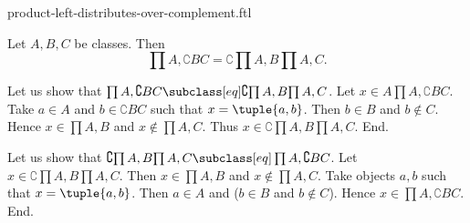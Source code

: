 \documentclass{article}
\begin{document}
\begin{smodule}[creators={Marcel Schütz}]{product-left-distributes-over-complement.ftl}

  \begin{fproposition*}[label=8696705885143040]
    Let $A, B, C$ be classes.
    Then \[\prod{A,\complement{B}{C}} = \complement{\prod{A,B}}{\prod{A,C}}.\]
  \end{fproposition*}
  \begin{fproof}
    Let us show that $\prod{A,\complement{B}{C}} \subclass[eq] \complement{\prod{A,B}}{\prod{A,C}}$.
      Let $x \in A \prod{A,\complement{B}{C}}$.
      Take $a \in A$ and $b \in \complement{B}{C}$ such that $x = \tuple{a,b}$.
      Then $b \in B$ and $b \notin C$.
      Hence $x \in \prod{A,B}$ and $x \notin \prod{A,C}$.
      Thus $x \in \complement{\prod{A,B}}{\prod{A,C}}$.
    End.

    Let us show that $\complement{\prod{A,B}}{\prod{A,C}} \subclass[eq] \prod{A,\complement{B}{C}}$.
      Let $x \in \complement{\prod{A,B}}{\prod{A,C}}$.
      Then $x \in \prod{A,B}$ and $x \notin \prod{A,C}$.
      Take objects $a, b$ such that $x = \tuple{a,b}$.
      Then $a \in A$ and ($b \in B$ and $b \notin C$).
      Hence $x \in \prod{A,\complement{B}{C}}$.
    End.
  \end{fproof}
\end{smodule}
\end{document}
